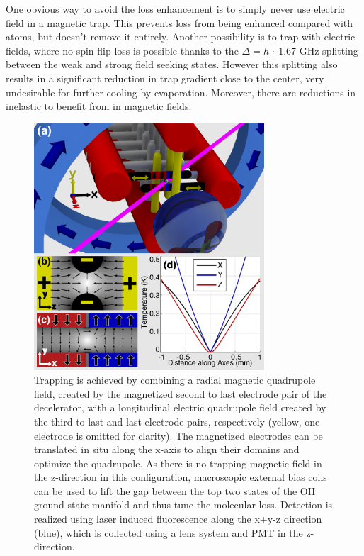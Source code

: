 \documentclass[%
 reprint,
 amsmath,amssymb,
 aps,
prl,
]{revtex4-1}
\begin{document}


One obvious way to avoid the loss enhancement is to simply never use electric field in a magnetic trap. This prevents loss from being enhanced compared with atoms, but doesn't remove it entirely. Another possibility is to trap with electric fields, where no spin-flip loss is possible thanks to the $\Delta=h\,\cdot\,1.67\text{ GHz}$ splitting between the weak and strong field seeking states. However this splitting also results in a significant reduction in trap gradient close to the center, very undesirable for further cooling by evaporation. Moreover, there are reductions in inelastic to benefit from in magnetic fields. \cite{stuhl2012evap}

\begin{figure}
\includegraphics[width=86mm]{Geometry/CAD_recolor_laser_panels.PNG}%
\caption{
Trapping is achieved by combining a radial magnetic quadrupole field, created by the magnetized second to last electrode pair of the decelerator, with a longitudinal electric quadrupole field created by the third to last and last electrode pairs, respectively (yellow, one electrode is omitted for clarity). The magnetized electrodes can be translated in situ along the x-axis to align their domains and optimize the quadrupole. As there is no trapping magnetic field in the z-direction in this configuration, macroscopic external bias coils can be used to lift the gap between the top two states of the OH ground-state manifold and thus tune the molecular loss. Detection is realized using laser induced fluorescence along the x+y-z direction (blue), which is collected using a lens system and PMT in the z-direction.
\label{fig:CAD}}
\end{figure}
\end{document}
